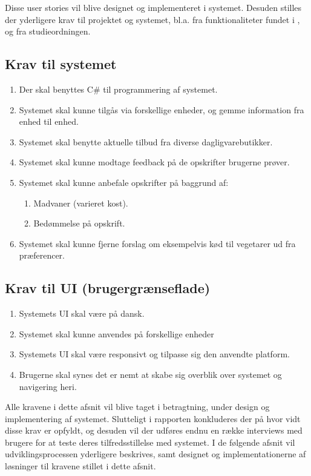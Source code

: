 Disse user stories vil blive designet og implementeret i systemet.
Desuden stilles der yderligere krav til projektet og systemet, bl.a. fra funktionaliteter fundet i , og fra studieordningen.

\subsection{Krav til systemet}
\begin{enumerate}
\item Der skal benyttes C\# til programmering af systemet.
\item Systemet skal kunne tilgås via forskellige enheder, og gemme information fra enhed til enhed.
\item Systemet skal benytte aktuelle tilbud fra diverse dagligvarebutikker.
\item Systemet skal kunne modtage feedback på de opskrifter brugerne prøver.
\item Systemet skal kunne anbefale opskrifter på baggrund af:
\begin{enumerate}
	\item Madvaner (varieret kost).
	\item Bedømmelse på opskrift.
\end{enumerate}
\item Systemet skal kunne fjerne forslag om eksempelvis kød til vegetarer ud fra præferencer.
\end{enumerate}

\subsection{Krav til UI (brugergrænseflade)}
\begin{enumerate}
	\item Systemets UI skal være på dansk.
	\item Systemet skal kunne anvendes på forskellige enheder
	\item Systemets UI skal være responsivt og tilpasse sig den anvendte platform.
	\item Brugerne skal synes det er nemt at skabe sig overblik over systemet og navigering heri.
\end{enumerate}

Alle kravene i dette afsnit vil blive taget i betragtning, under design og implementering af systemet.
Slutteligt i rapporten konkluderes der på hvor vidt disse krav er opfyldt, og desuden vil der udføres endnu en række interviews med brugere for at teste deres tilfredsstillelse med systemet.
I de følgende afsnit vil udviklingsprocessen yderligere beskrives, samt designet og implementationerne af løsninger til kravene stillet i dette afsnit.
